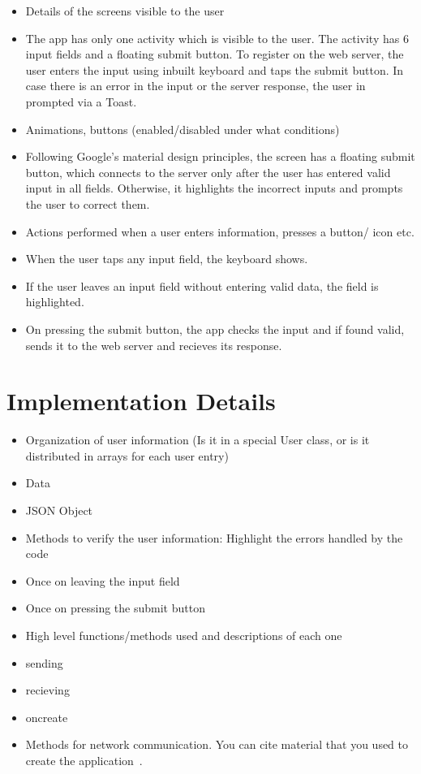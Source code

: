 \documentclass[12pt,a4paper,titlepage]{article}
\begin{document}
\begin{itemize}
	\item Details of the screens visible to the user
	\item[] The app has only one activity which is visible to the user. The activity has 6 input fields and a floating submit button. To register on the web server, the user enters the input using inbuilt keyboard and taps the submit button. In case there is an error in the input or the server response, the user in prompted via a Toast.
	      
	\item Animations, buttons (enabled/disabled under what conditions)
	\item[] Following Google's material design principles, the screen has a floating submit button, which connects to the server only after the user has entered valid input in all fields. Otherwise, it highlights the incorrect inputs and prompts the user to correct them.
	\item Actions performed when a user enters information, presses a button/ icon etc.
	\item[] When the user taps any input field, the keyboard shows. 
	\item[] If the user leaves an input field without entering valid data, the field is highlighted.
	\item[] On pressing the submit button, the app checks the input and if found valid, sends it to the web server and recieves its response.
\end{itemize}

\section{Implementation Details}

\begin{itemize}
	\item Organization of user information (Is it in a special User class, or is it distributed in arrays for each user entry)
	\item[] Data
	\item[] JSON Object
	\item Methods to verify the user information: Highlight the errors handled by the code
	\item[] Once on leaving the input field
	\item[] Once on pressing the submit button
	\item  High	level functions/methods used and descriptions of each one	
	\item [] sending
	\item[] recieving
	\item[] oncreate
	\item Methods for network communication. You can cite material that you used to create the application~\cite{android_network_tutorial}.
\end{itemize}
\end{document}
